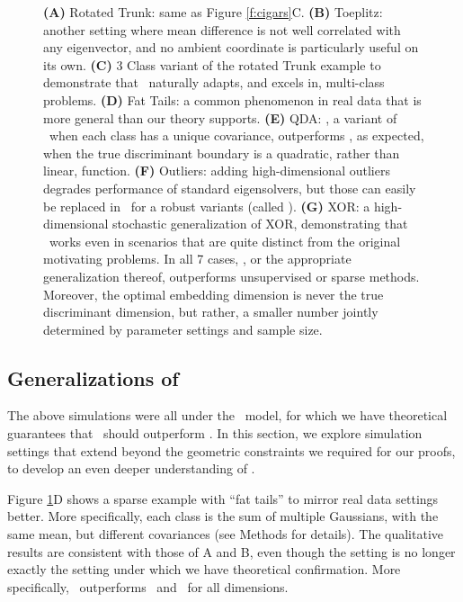 \documentclass[10pt]{article}
\begin{document}
\begin{figure}[h!]
{\textbf{(A)} Rotated Trunk: same as Figure \ref{f:cigars}C.
\textbf{(B)} Toeplitz: another setting where mean difference is not well correlated with any eigenvector, and no ambient coordinate is particularly useful on its own.
\textbf{(C)} 3 Class variant of the rotated Trunk example to demonstrate that \Lol~naturally adapts, and excels in, multi-class problems.
\textbf{(D)} Fat Tails: a common phenomenon in real data that is more general than our theory supports.
\textbf{(E)} QDA: \Qoq, a variant of \Lol~when each class has a unique covariance, outperforms \Lol, as expected, when the true discriminant boundary is a quadratic, rather than linear, function.
\textbf{(F)} Outliers: adding high-dimensional outliers degrades performance of standard eigensolvers, but those can easily be replaced in \Lol~for a robust variants (called \Lrl).
\textbf{(G)} XOR: a high-dimensional stochastic generalization of XOR, demonstrating that \Qoq~works even in scenarios that are quite distinct from the original motivating problems.
In all 7 cases, \Lol, or the appropriate generalization thereof, outperforms unsupervised or sparse methods.  Moreover, the optimal embedding dimension is never the true discriminant dimension, but rather, a smaller number jointly determined by parameter settings and sample size.
}
\label{f:properties}
\end{figure}



\subsection*{Generalizations of \Lol}


The above simulations were all under the \Lda~model, for which we have theoretical guarantees that \Lol~should outperform \PoF.  In this section, we explore simulation settings that extend beyond the geometric constraints we required for our proofs, to develop an even deeper understanding of \Lol.

 Figure \ref{f:properties}D shows a sparse example with ``fat tails'' to mirror real data settings better. More specifically, each class is the sum of multiple Gaussians, with the same mean, but different covariances (see Methods for details). The qualitative results are consistent with those of A and B, even though the setting is no longer exactly the setting under which we have theoretical confirmation. More specifically, \Lol~outperforms \PoF~and \Road~for all dimensions.  
\end{document}
